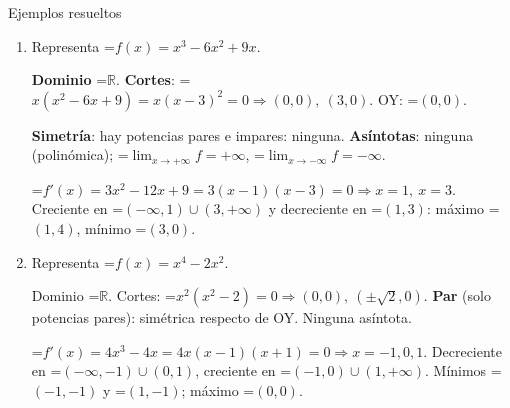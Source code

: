 \documentclass[11pt,a4paper]{article}
\newcommand{\fmm}[1]{\setbox0=\hbox{$#1$}\ifdim\wd0>\linewidth\[#1\]\else\mbox{\box0}\fi}
\begin{document}
  
\begin{fmex}{Ejemplos resueltos}
\begin{enumerate}[label=\textbf{\arabic*.},leftmargin=*]
\item Representa \fmm{f(x)=x^3-6x^2+9x}.
          

            

\textbf{Dominio} \fmm{\mathbb R}. \textbf{Cortes}: \fmm{x(x^2-6x+9)=x(x-3)^2=0\Rightarrow(0,0),\ (3,0)}. OY: \fmm{(0,0)}.

            

\textbf{Simetría}: hay potencias pares e impares: ninguna. \textbf{Asíntotas}: ninguna (polinómica); \fmm{\lim_{x\to+\infty}f=+\infty}, \fmm{\lim_{x\to-\infty}f=-\infty}.

            

\fmm{f'(x)=3x^2-12x+9=3(x-1)(x-3)=0\Rightarrow x=1,\ x=3}. Creciente en \fmm{(-\infty,1)\cup(3,+\infty)} y decreciente en \fmm{(1,3)}: máximo \fmm{(1,4)}, mínimo \fmm{(3,0)}.

            

\begin{center}\end{center}
\item Representa \fmm{f(x)=x^4-2x^2}.
          

            

Dominio \fmm{\mathbb R}. Cortes: \fmm{x^2(x^2-2)=0\Rightarrow(0,0),\ (\pm\sqrt2,0)}. \textbf{Par} (solo potencias pares): simétrica respecto de OY. Ninguna asíntota.

            

\fmm{f'(x)=4x^3-4x=4x(x-1)(x+1)=0\Rightarrow x=-1,0,1}. Decreciente en \fmm{(-\infty,-1)\cup(0,1)}, creciente en \fmm{(-1,0)\cup(1,+\infty)}. Mínimos \fmm{(-1,-1)} y \fmm{(1,-1)}; máximo \fmm{(0,0)}.


\end{enumerate}
\end{fmex}
\end{document}
